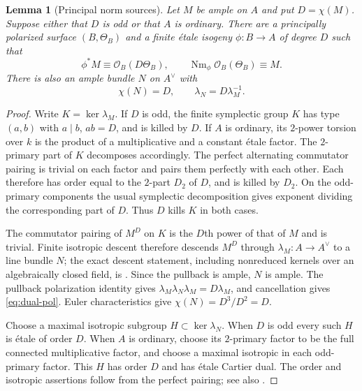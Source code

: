 \documentclass[11pt]{article}
\newtheorem{lemma}[theorem]{Lemma}
\theoremstyle{definition}\newtheorem{definition}[theorem]{Definition}
\theoremstyle{remark}\newtheorem{remark}[theorem]{Remark}
\newcommand{\OO}{\mathcal O}
\newcommand{\Nm}{\operatorname{Nm}}
\begin{document}
\begin{lemma}[Principal norm sources]\label{lem:principal-source}
Let $M$ be ample on $A$ and put $D=\chi(M)$. Suppose either that $D$ is odd or that $A$ is ordinary. There are a principally polarized surface $(B,\Theta_B)$ and a finite \'etale isogeny $\phi:B\to A$ of degree $D$ such that
\[
 \phi^*M\equiv\OO_B(D\Theta_B),\qquad
 \Nm_\phi\OO_B(\Theta_B)\equiv M.
\]
There is also an ample bundle $N$ on $A^\vee$ with
\begin{equation}\label{eq:dual-pol}
 \chi(N)=D,\qquad\lambda_N=D\lambda_M^{-1}.
\end{equation}
\end{lemma}
\begin{proof}
Write $K=\ker\lambda_M$. If $D$ is odd, the finite symplectic group $K$ has type $(a,b)$ with $a\mid b$, $ab=D$, and is killed by $D$. If $A$ is ordinary, its $2$-power torsion over $k$ is the product of a multiplicative and a constant \'etale factor. The $2$-primary part of $K$ decomposes accordingly. The perfect alternating commutator pairing is trivial on each factor and pairs them perfectly with each other. Each therefore has order equal to the $2$-part $D_2$ of $D$, and is killed by $D_2$. On the odd-primary components the usual symplectic decomposition gives exponent dividing the corresponding part of $D$. Thus $D$ kills $K$ in both cases.

The commutator pairing of $M^D$ on $K$ is the $D$th power of that of $M$ and is trivial. Finite isotropic descent therefore descends $M^D$ through $\lambda_M:A\to A^\vee$ to a line bundle $N$; the exact descent statement, including nonreduced kernels over an algebraically closed field, is \citet[Theorem~8.10 and Corollary~8.11, pp.~116--117]{EGM}. Since the pullback is ample, $N$ is ample. The pullback polarization identity gives
$\lambda_M\lambda_N\lambda_M=D\lambda_M$, and cancellation gives \eqref{eq:dual-pol}. Euler characteristics give $\chi(N)=D^3/D^2=D$.

Choose a maximal isotropic subgroup $H\subset\ker\lambda_N$. When $D$ is odd every such $H$ is \'etale of order $D$. When $A$ is ordinary, choose its $2$-primary factor to be the full connected multiplicative factor, and choose a maximal isotropic in each odd-primary factor. This $H$ has order $D$ and has \'etale Cartier dual. The order and isotropic assertions follow from the perfect pairing; see also \citet[Proposition~8.19--Corollary~8.20, p.~119]{EGM}.


\end{proof}
\end{document}
